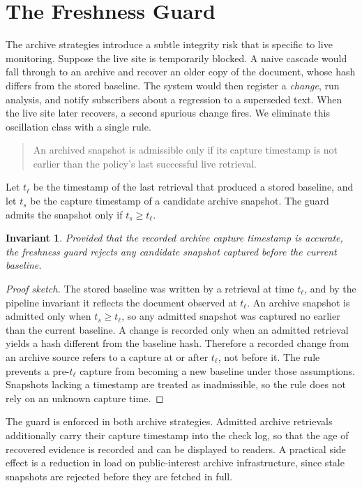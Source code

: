 \documentclass[11pt]{article}
\newtheorem{invariant}{Invariant}
\begin{document}
\section{The Freshness Guard}
\label{sec:freshness}

The archive strategies introduce a subtle integrity risk that is specific to
live monitoring. Suppose the live site is temporarily blocked. A naive cascade
would fall through to an archive and recover an older copy of the document, whose
hash differs from the stored baseline. The system would then register a
\emph{change}, run analysis, and notify subscribers about a regression to a
superseded text. When the live site later recovers, a second spurious change
fires. We eliminate this oscillation class with a single rule.

\begin{quote}
An archived snapshot is admissible only if its capture timestamp is not earlier
than the policy's last successful live retrieval.
\end{quote}

\noindent Let $t_\ell$ be the timestamp of the last retrieval that produced a
stored baseline, and let $t_s$ be the capture timestamp of a candidate archive
snapshot. The guard admits the snapshot only if $t_s \ge t_\ell$.

\begin{invariant}
Provided that the recorded archive capture timestamp is accurate, the freshness
guard rejects any candidate snapshot captured before the current baseline.
\end{invariant}

\begin{proof}[Proof sketch]
The stored baseline was written by a retrieval at time $t_\ell$, and by the
pipeline invariant it reflects the document observed at $t_\ell$. An archive
snapshot is admitted only when $t_s \ge t_\ell$, so any admitted snapshot was
captured no earlier than the current baseline. A change is recorded only when an
admitted retrieval yields a hash different from the baseline hash. Therefore a
recorded change from an archive source refers to a capture at or after $t_\ell$,
not before it. The rule prevents a pre-$t_\ell$ capture from becoming a new
baseline under those assumptions. Snapshots lacking a timestamp are treated as
inadmissible, so the rule does not rely on an unknown capture time.
\end{proof}

The guard is enforced in both archive strategies. Admitted archive retrievals
additionally carry their capture timestamp into the check log, so that the age of
recovered evidence is recorded and can be displayed to readers. A practical side
effect is a reduction in load on public-interest archive infrastructure, since
stale snapshots are rejected before they are fetched in full.
\end{document}
